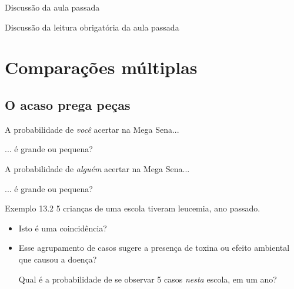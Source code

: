 \documentclass{beamer}
\begin{document}

\begin{frame}{\scriptsize Discussão da aula passada}
  \begin{block}{}
    Discussão da leitura obrigatória da aula passada
  \end{block}
\end{frame}

\section{Comparações múltiplas}

\subsection[Coincidências]{O acaso prega peças}

\begin{frame}{\scriptsize }
  \begin{center}
    A probabilidade de {\em você} acertar na Mega Sena...

    \bigskip
    ... é grande ou pequena?
  \end{center}
\end{frame}

\begin{frame}{\scriptsize }
  \begin{center}
    A probabilidade de {\em alguém} acertar na Mega Sena...

    \bigskip
    ... é grande ou pequena?
  \end{center}
\end{frame}

\begin{frame}{\scriptsize }
  \begin{exampleblock}{Exemplo 13.2}
    \footnotesize
    5 crianças de uma escola tiveram leucemia, ano passado.

    \begin{itemize}
      \footnotesize
    \item Isto é uma coincidência?
    \item Esse agrupamento de casos sugere a presença de toxina ou efeito ambiental que causou a doença?

      \bigskip
      \begin{exampleblock}{}
        \footnotesize
        Qual é a probabilidade de se observar 5 casos {\em nesta} escola, em um ano?
      \end{exampleblock}
    \end{itemize}
  \end{exampleblock}
\end{frame}
\end{document}
